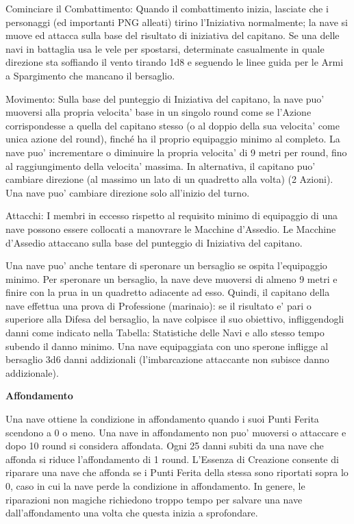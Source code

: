 \documentclass[a4paper,11pt,twoside,openany]{book}
\begin{document}
{		{Cominciare il Combattimento:} Quando il combattimento inizia, lasciate che i personaggi (ed importanti PNG alleati) tirino l'Iniziativa normalmente; la nave si muove ed attacca sulla base del risultato di iniziativa del capitano. Se una delle navi in battaglia usa le vele per spostarsi, determinate casualmente in quale direzione sta soffiando il vento tirando 1d8 e seguendo le linee guida per le Armi a Spargimento che mancano il bersaglio.{}
		
		{Movimento:} Sulla base del punteggio di Iniziativa del capitano, la nave puo' muoversi alla propria velocita' base in un singolo round come se l'Azione corrispondesse a quella del capitano stesso (o al doppio della sua velocita' come unica azione del round), finché ha il proprio equipaggio minimo al completo. La nave puo' incrementare o diminuire la propria velocita' di 9 metri per round, fino al raggiungimento della velocita' massima. In alternativa, il capitano puo' cambiare direzione (al massimo un lato di un quadretto alla volta) (2 Azioni). Una nave puo' cambiare direzione solo all'inizio del turno.{}
		
		{Attacchi:} I membri in eccesso rispetto al requisito minimo di equipaggio di una nave possono essere collocati a manovrare le Macchine d'Assedio. Le Macchine d'Assedio attaccano sulla base del punteggio di Iniziativa del capitano.{}
		
		Una nave puo' anche tentare di speronare un bersaglio se ospita l'equipaggio minimo. Per speronare un bersaglio, la nave deve muoversi di almeno 9 metri e finire con la prua in un quadretto adiacente ad esso. 
		Quindi, il capitano della nave effettua una prova di Professione (marinaio): se il risultato e' pari o superiore alla Difesa del bersaglio, la nave colpisce il suo obiettivo, infliggendogli danni come indicato nella Tabella: Statistiche delle Navi e allo stesso tempo subendo il danno minimo. Una nave equipaggiata con uno sperone infligge al bersaglio 3d6 danni addizionali (l'imbarcazione attaccante non subisce danno addizionale).
		
		\textbf{Affondamento}
		
		Una nave ottiene la condizione in affondamento quando i suoi Punti Ferita scendono a 0 o meno. Una nave in affondamento non puo' muoversi o attaccare e dopo 10 round si considera affondata. Ogni 25 danni subiti da una nave che affonda si riduce l'affondamento di 1 round. L’Essenza di Creazione consente di riparare una nave che affonda se i Punti Ferita della stessa sono riportati sopra lo 0, caso in cui la nave perde la condizione in affondamento. In genere, le riparazioni non magiche richiedono troppo tempo per salvare una nave dall'affondamento una volta che questa inizia a sprofondare.
		
}
\end{document}
